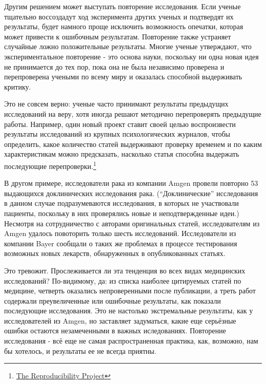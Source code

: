 Другим решением может выступать повторение исследования. Если ученые тщательно воссоздадут ход эксперимента других ученых и подтвердят их результаты, будет намного проще исключить возможность опечатки, которая может привести к ошибочным результатам. Повторение также устраняет случайные ложно положительные результаты. Многие ученые утверждают, что экспериментальное повторение - это основа науки, поскольку ни одна новая идея не принимается до тех пор, пока она не была независимо проверена и перепроверена учеными по всему миру и оказалась способной выдерживать критику.  

Это не совсем верно: ученые часто принимают результаты предыдущих исследований на веру, хотя иногда решают методично перепроверять предыдущие работы. Например, один новый проект ставит своей целью воспроизвести результаты исследований из крупных психологических журналов, чтобы определить, какое количество статей выдерживают проверку временем и по каким характеристикам можно предсказать, насколько статья способна выдержать последующие перепроверки.\footnote{\href{http://openscienceframework.org/reproducibility/}{The Reproducibility Project}} 

В другом примере, исследователи рака из компании Amgen провели повторно 53 выдающихся доклинических исследования рака. (``Доклинические'' исследования в данном случае подразумеваются исследования, в которых не участвовали пациенты, поскольку в них проверялись новые и неподтвержденные идеи.) Несмотря на сотрудничество с авторами оригинальных статей, исследователям из Amgen удалось повоторить только шесть исследований. \cite{begley_drug_2012} Исследователи из компании Bayer сообщали о таких же проблемах в процессе тестирования возможных новых лекарств, обнаруженных в опубликованных статьях. \cite{prinz_believe_2011}

Это тревожит. Прослеживается ли эта тенденция во всех видах медицинских исследований? По-видимому, да: из списка наиболее цитируемых статей по медицине, четверть оказались непроверенными после публикации, а треть работ содержали преувеличенные или ошибочные результаты, как показали последующие исследования. \cite{ioannidis_contradicted_2005} Это не настолько экстремальные результаты, как у исследователей из Amgen, но заставляет задуматься, какие еще серьёзные ошибки остаются незамеченными в важных иследованиях. Повторение исследования - всё еще не самая распространенная практика, как, возможно, нам бы хотелось, и результаты ее не всегда приятны.

